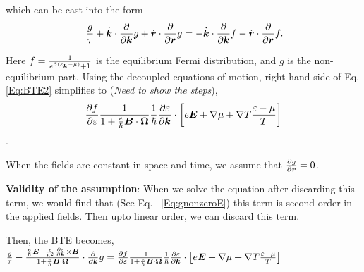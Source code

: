 \documentclass{report}
\renewcommand\vec[1]{\ensuremath\boldsymbol{#1}} %
\begin{document}
which can be cast into the form
\begin{equation}~\label{Eq:BTE2}
	\frac{g}{\tau} + \dot{\vec{k}}\cdot\frac{\partial}{\partial \vec{k}} g + \dot{\vec{r}}\cdot\frac{\partial}{\partial \vec{r}} g = -\dot{\vec{k}}\cdot\frac{\partial}{\partial \vec{k}}f - \dot{\vec{r}}\cdot\frac{\partial}{\partial \vec{r}}f.
\end{equation}

Here $f = \frac{1}{e^{\beta(\varepsilon_{\vec{k}} - \mu)} + 1}$ is the equilibrium Fermi distribution, and $g$ is the non-equilibrium part.
Using the decoupled equations of motion, right hand side of Eq. \eqref{Eq:BTE2} simplifies to (\textit{Need to show the steps}),
$$\frac{\partial f}{\partial \varepsilon}\frac{1}{1 + \frac{e}{\hbar} \vec{B}\cdot\vec{\Omega}}
\frac{1}{\hbar} \frac{\partial \varepsilon}{\partial \vec{k}}\cdot\left[e \vec{E} + \nabla{\mu} + \nabla T \frac{\varepsilon - \mu}{T}\right]
$$.

When the fields are constant in space and time, we assume that $\frac{\partial{g}}{\partial \vec{r}} = 0$.

\textbf{Validity of the assumption}: When we solve the equation after discarding this term, we would find that (See Eq. ~\eqref{Eq:gnonzeroE}) this term is second order in the applied fields. Then upto linear order, we can discard this term.

Then, the BTE becomes,
$\frac{g}{\tau} -\frac{\frac{e}{\hbar} \vec{E} +\frac{e}{\hbar^2} \frac{\partial \varepsilon}{\partial \vec{k}} \times \vec{B}}{1 + \frac{e}{\hbar} \vec{B} \cdot \vec{\Omega}} \cdot\frac{\partial}{\partial \vec{k}} g = \frac{\partial f}{\partial \varepsilon}\frac{1}{1 + \frac{e}{\hbar} \vec{B} \cdot \vec{\Omega}}
\frac{1}{\hbar} \frac{\partial \varepsilon}{\partial \vec{k}}\cdot\left[e \vec{E} + \nabla{\mu} + \nabla T \frac{\varepsilon - \mu}{T}\right] $

\end{document}

